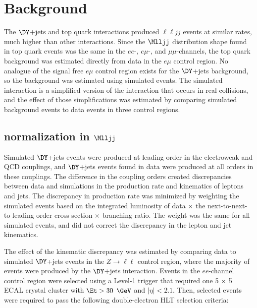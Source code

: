 \section{\DY Background}
\label{sec:dyBkgnd}
The $\DY$+jets and top quark interactions produced $\ell\ell jj$ events at similar rates, much higher than other interactions.  Since 
the $\Mlljj$ distribution shape found in top quark events was the same in the $ee$-, $e\mu$-, and $\mu\mu$-channels, 
the top quark background was estimated directly from data in the $e\mu$ control region.  No analogue of the signal free $e\mu$ control region 
exists for the $\DY$+jets background, so the \DY background was estimated using simulated events.  The simulated \DY interaction is a 
simplified version of the \DY interaction that occurs in real collisions, and the effect of those simplifications was estimated by 
comparing simulated background events to data events in three control regions.

\subsection{\DY normalization in $\Mlljj$}
\label{sec:dyNormInMlljj}
Simulated $\DY$+jets events were produced at leading order in the electroweak and QCD couplings, and $\DY$+jets events found in 
data were produced at all orders in these couplings.  The difference in the coupling orders created discrepancies between data and 
simulations in the production rate and kinematics of leptons and jets.  The discrepancy in production rate was minimized by 
weighting the simulated events based on the integrated luminosity of data $\times$ the next-to-next-to-leading order \DY cross section 
$\times$ branching ratio.  The weight was the same for all simulated events, and did not correct the discrepancy in the lepton and jet 
kinematics.

The effect of the kinematic discrepancy was estimated by comparing data to simulated $\DY$+jets events in the $Z \rightarrow \ell\ell$ 
control region, where the majority of events were produced by the $\DY$+jets interaction.  Events in the $ee$-channel control region were 
selected using a Level-1 trigger that required one 5 $\times$ 5 ECAL crystal cluster with $\Et > 30$ $\GeV$ and $|\eta| < 2.1$.  Then, 
selected events were required to pass the following double-electron HLT selection criteria:

